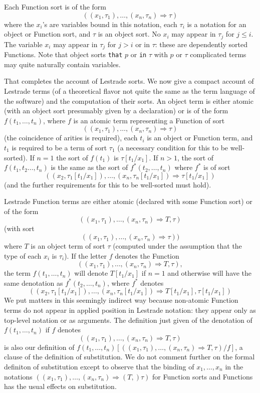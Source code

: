 \documentclass{article}
\begin{document}
Each Function sort is of the form $$((x_1,\tau_1),\ldots,(x_n,\tau_n) \Rightarrow \tau)$$  where the $x_i$'s are variables bound in this notation, each $\tau_i$ is a notation for an object or Function sort, and $\tau$ is an object sort.  No $x_i$ may appear in $\tau_j$ for $j\leq i$.  The variable $x_i$ may appear in $\tau_j$ for $j>i$ or in $\tau$:  these are dependently sorted Functions.  Note that object sorts {\tt that} $p$ or {\tt in} $\tau$ with $p$ or $\tau$ complicated terms may quite naturally contain variables.

That completes the account of Lestrade sorts.  We now give a compact account of Lestrade terms (of a theoretical flavor not quite the same as the term language of the software) and the computation of their sorts.  An object term is either atomic (with an object  sort presumably given by a declaration) or is of the form $f(t_1,\ldots,t_n)$, where $f$ is an atomic term representing a Function of sort
$$((x_1,\tau_1),\ldots,(x_n,\tau_n) \Rightarrow \tau)$$ (the coincidence of arities is required), each $t_i$ is an object or Function term, and $t_1$ is required to be a term of sort $\tau_1$ (a necessary condition for this to be well-sorted).  If $n=1$ the sort
of $f(t_1)$ is $\tau[t_1/x_1]$.  If $n>1$, the sort of $f(t_1,t_2\ldots,t_n)$ is the same as the sort of $f^*(t_2,\ldots,t_n)$ where $f^*$ is of sort
$$((x_2,\tau_1[t_1/x_1]),\ldots,(x_n,\tau_n[t_1/x_1]) \Rightarrow \tau[t_1/x_1])$$ (and the further requirements for this to be well-sorted must hold).

Lestrade Function terms are either atomic (declared with some Function sort) or of the form $$((x_1,\tau_1),\ldots,(x_n,\tau_n) \Rightarrow T,\tau)$$ (with sort  $$((x_1,\tau_1),\ldots,(x_n,\tau_n) \Rightarrow \tau))$$ where $T$ is an object term of sort $\tau$ (computed under the assumption that the type of each $x_i$ is $\tau_i$).  If the letter $f$ denotes the Function $$((x_1,\tau_1),\ldots,(x_n,\tau_n) \Rightarrow T,\tau),$$
the term $f(t_1,\ldots,t_n)$ will denote $T[t_1/x_1]$ if $n=1$ and otherwise will have the same denotation as $f^*(t_2,\ldots,t_n)$, where $f^*$ denotes
$$((x_2,\tau_1[t_1/x_1]),\ldots,(x_n,\tau_n[t_1/x_1]) \Rightarrow T[t_1/x_1],\tau[t_1/x_1])$$  We put matters in this seemingly indirect way because non-atomic Function terms do not appear in applied position in Lestrade notation:  they appear only as top-level notation or as arguments.  The definition just
given of the denotation of  $f(t_1,\ldots,t_n)$ if $f$ denotes  $$((x_1,\tau_1),\ldots,(x_n,\tau_n) \Rightarrow T,\tau)$$ is also our definition of $f(t_1,\ldots,t_n)[((x_1,\tau_1),\ldots,(x_n,\tau_n) \Rightarrow T,\tau)/f]$, a clause of the definition of substitution.  We do not comment further on the formal definiton of substitution except to observe that the binding of $x_1,\ldots,x_n$ in the notations $((x_1,\tau_1),\ldots,(x_n,\tau_n) \Rightarrow (T,)\tau)$ for Function sorts and Functions has the usual effects on substitution.
\end{document}
